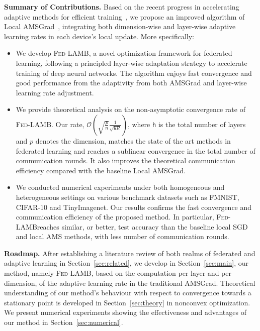 \documentclass[11pt]{article}
\def\tot{\mathsf{h}}
\newcommand{\algo}{\textsc{Fed-LAMB}}
\begin{document}
\noindent\textbf{Summary of Contributions.} Based on the recent progress in accelerating adaptive methods for efficient training~\citep{you2019large}, we propose an improved algorithm of Local AMSGrad~\citep{chen2020toward}, integrating both dimension-wise and layer-wise adaptive learning rates in each device's local update.
More specifically:
\begin{itemize}
\item We develop  \algo, a novel optimization framework for federated learning, following a principled layer-wise adaptation strategy to accelerate training of deep neural networks. The algorithm enjoys fast convergence and good performance from the adaptivity from both AMSGrad and layer-wise learning rate adjustment.

\item We provide theoretical analysis on the non-asymptotic convergence rate of \algo. Our rate, $\mathcal{O}\left(\sqrt{\frac{ p}{ n}} \frac{1}{\sqrt{\tot R} } \right)$, where $\tot$ is the total number of layers and $p$ denotes the dimension, matches the state of the art methods in federated learning and reaches a sublinear convergence in the total number of communication rounds. It also improves the theoretical communication efficiency compared with the baseline Local AMSGrad.

\item We conducted numerical experiments under both homogeneous and heterogeneous settings on various benchmark datasets such as FMNIST, CIFAR-10 and TinyImagenet. Our results confirms the fast convergence and communication efficiency of the proposed method. In particular, \algo reaches similar, or better, test accuracy than the baseline local SGD and local AMS methods, with less number of communication rounds.
\end{itemize}

\vspace{0.1in}
\noindent\textbf{Roadmap.} After establishing a literature review of both realms of federated and adaptive learning in Section~\ref{sec:related}, we develop in Section~\ref{sec:main}, our method, namely \algo, based on the computation per layer and per dimension, of the adaptive learning rate in the traditional AMSGrad.
Theoretical understanding of our method's behaviour with respect to convergence towards a stationary point is developed in Section~\ref{sec:theory} in nonconvex optimization.
We present numerical experiments showing the effectiveness and advantages of our method in Section~\ref{sec:numerical}.
\end{document}
